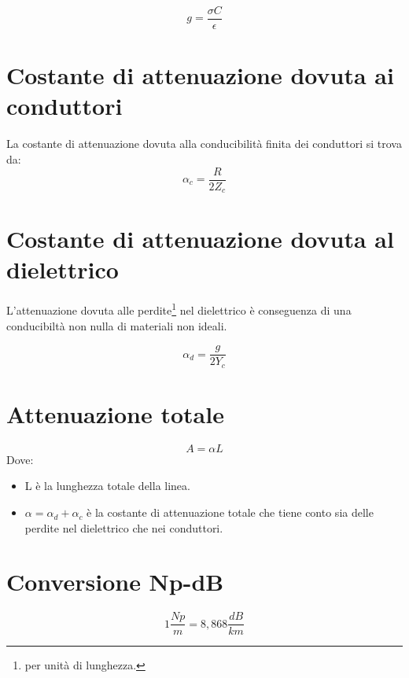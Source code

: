 \documentclass[10pt,a4paper]{report}
\begin{document}
			\begin{equation}
			g=\frac{\sigma C}{\epsilon}
			\end{equation}





	\section{Costante di attenuazione dovuta ai conduttori}
	
			La costante di attenuazione dovuta alla conducibilità finita dei conduttori si trova da:
			\begin{equation}
			\alpha_c=\frac{R}{2Z_c}
			\end{equation}
		
	\section{Costante di attenuazione dovuta al dielettrico}
	
			L'attenuazione dovuta alle perdite\footnote{per unità di lunghezza.} nel dielettrico è conseguenza di una conducibiltà non nulla di materiali non ideali.

			\begin{equation}
			\alpha_d=\frac{g}{2Y_c}
			\end{equation}

	\section{Attenuazione totale}

			\begin{equation}
			A=\alpha L
			\end{equation}
			Dove:
			\begin{itemize}
			\item L è la lunghezza totale della linea.
			\item $\alpha=\alpha_d+\alpha_c$ è la costante di attenuazione totale che tiene conto sia delle perdite nel dielettrico che nei conduttori.
			\end{itemize}

	\section{Conversione Np-dB}

	\[
	1\frac{Np}{m}=8,868\frac{dB}{km}
	\]
	
\end{document}
